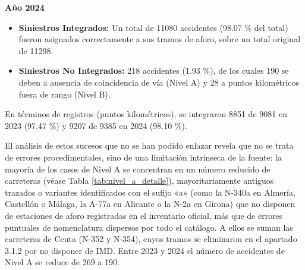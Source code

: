 \documentclass[twoside,a4paper,12pt,onecolumn,openany]{book}
\begin{document}
\vspace{0,5cm}

\textbf{Año 2024}

\begin{itemize}
    \item \textbf{Siniestros Integrados:} Un total de 11080 accidentes (98.07 \% del total) fueron asignados correctamente a sus tramos de aforo, sobre un total original de 11298.
    \item \textbf{Siniestros No Integrados:} 218 accidentes (1.93 \%), de los cuales 190 se deben a ausencia de coincidencia de vía (Nivel A) y 28 a puntos kilométricos fuera de rango (Nivel B).
\end{itemize}

En términos de registros (puntos kilométricos), se integraron 8851 de 9081 en 2023 (97.47 \%) y 9207 de 9385 en 2024 (98.10 \%).

\begin{table}[htbp]
\centering
\caption{Resumen de la auditoría de integración accidentes--tramos por año}
\label{tab:auditoria_integracion}
\renewcommand{\arraystretch}{1.3}
\end{table}

El análisis de estos sucesos que no se han podido enlazar revela que no se trata de errores procedimentales, sino de una limitación intrínseca de la fuente: la mayoría de los casos de Nivel A se concentran en un número reducido de carreteras (véase Tabla \ref{tab:nivel_a_detalle}), mayoritariamente antiguos trazados o variantes identificados con el sufijo «a» (como la N-340a en Almería, Castellón o Málaga, la A-77a en Alicante o la N-2a en Girona) que no disponen de estaciones de aforo registradas en el inventario oficial, más que de errores puntuales de nomenclatura dispersos por todo el catálogo. A ellos se suman las carreteras de Ceuta (N-352 y N-354), cuyos tramos se eliminaron en el apartado 3.1.2 por no disponer de IMD. Entre 2023 y 2024 el número de accidentes de Nivel A se reduce de 269 a 190.
\end{document}
